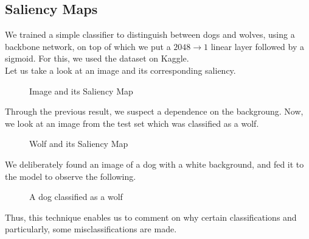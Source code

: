 \subsection{Saliency Maps}
We trained a simple classifier to distinguish between dogs and wolves, using a \cite{ResNet} backbone network, on top of which we put a $2048 \to 1$ linear layer followed by a sigmoid. For this, we used the \cite{dogvwolf} dataset on Kaggle. \\ Let us take a look at an image and its corresponding saliency.
\begin{figure}[H]
    \centering
    \qquad
    \caption[Short text]{Image and its Saliency Map}
\end{figure}
Through the previous result, we suspect a dependence on the backgroung. Now, we look at an image from the test set which was classified as a wolf.
\begin{figure}[H]
    \centering
    \qquad
    \caption[Short text]{Wolf  and its Saliency Map}
\end{figure}
We deliberately found an image of a dog with a white background, and fed it to the model to observe the following.
\begin{figure}[H]
    \centering
    \qquad
    \caption[Short text]{A dog classified as a wolf}
\end{figure}
Thus, this technique enables us to comment on why certain classifications and particularly, some misclassifications are made.